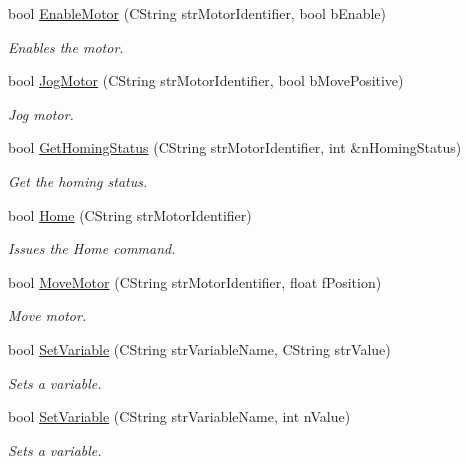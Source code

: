 \begin{CompactItemize}
bool \hyperlink{classTangoInterface_e7b82506f5a1c901fd7f5e0843841c7d}{EnableMotor} (CString strMotorIdentifier, bool bEnable)
\begin{CompactList}\small\item\em Enables the motor. \item\end{CompactList}\item 
bool \hyperlink{classTangoInterface_ab781c1b152882cff163edd81407033f}{JogMotor} (CString strMotorIdentifier, bool bMovePositive)
\begin{CompactList}\small\item\em Jog motor. \item\end{CompactList}\item 
bool \hyperlink{classTangoInterface_98190a21946b4aa04b7d4b12ababa768}{GetHomingStatus} (CString strMotorIdentifier, int \&nHomingStatus)
\begin{CompactList}\small\item\em Get the homing status. \item\end{CompactList}\item 
bool \hyperlink{classTangoInterface_e6da63765a09f8c53a8537faee7f63b5}{Home} (CString strMotorIdentifier)
\begin{CompactList}\small\item\em Issues the Home command. \item\end{CompactList}\item 
bool \hyperlink{classTangoInterface_9db5a121d918ac94527d5e3fc635d002}{MoveMotor} (CString strMotorIdentifier, float fPosition)
\begin{CompactList}\small\item\em Move motor. \item\end{CompactList}\item 
bool \hyperlink{classTangoInterface_c37a6c8ebf341566b1cba2ce56630811}{SetVariable} (CString strVariableName, CString strValue)
\begin{CompactList}\small\item\em Sets a variable. \item\end{CompactList}\item 
bool \hyperlink{classTangoInterface_ded717121a0c221a3b7528d221d24657}{SetVariable} (CString strVariableName, int nValue)
\begin{CompactList}\small\item\em Sets a variable. \item\end{CompactList}\item 

\end{CompactItemize}
